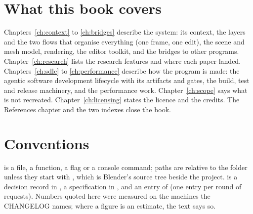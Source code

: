 \section{What this book covers}
Chapters~\ref{ch:context} to \ref{ch:bridges} describe the system: its context, the layers and the two flows that
organise everything (one frame, one edit), the scene and mesh model, rendering, the editor toolkit, and the bridges to
other programs. Chapter~\ref{ch:research} lists the research features and where each paper landed. Chapters~\ref{ch:sdlc}
to \ref{ch:performance} describe how the program is made: the agentic software development lifecycle with its
artifacts and gates, the build, test and release machinery, and the performance work. Chapter~\ref{ch:scope} says what
is not recreated. Chapter~\ref{ch:licensing} states the licence and the credits. The References chapter and the two
indexes close the book.

\section{Conventions}
 is a file, a function, a flag or a console command; paths are relative to the  folder
unless they start with , which is Blender's source tree beside the project.  is a decision
record in ,  a specification in , and  an entry of
 (one entry per round of requests). Numbers quoted here were measured on the machines the CHANGELOG
names; where a figure is an estimate, the text says so.

